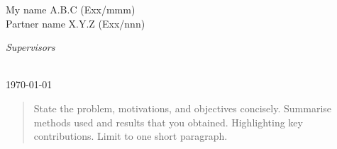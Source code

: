 \begin{titlepage}
\begin{minipage}[t]{.4\textwidth}
\begin{flushleft}
My name A.B.C (Exx/mmm)\\
Partner name X.Y.Z (Exx/nnn)
\end{flushleft}

\end{minipage}\hfill\begin{minipage}[t]{.4\textwidth}

\begin{flushright}
\emph{Supervisors} 

\end{flushright}
\end{minipage}
\\[3cm]

{\today}\\[3cm]

\end{titlepage}


\begin{abstract}
State the problem, motivations, and objectives concisely. Summarise methods used and results that you obtained. Highlighting key contributions. Limit to one short paragraph.
\end{abstract}
